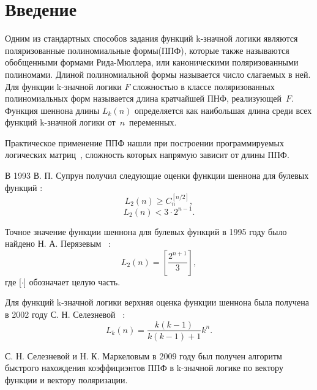 \documentclass[a4paper, 14pt]{extarticle}
\begin{document}


\setcounter{secnumdepth}{-1}

\section{Введение}
Одним из стандартных способов задания функций k\nobreakdash-значной логики являются поляризованные полиномиальные формы(ППФ),
которые также называются обобщенными формами Рида-Мюллера, или каноническими поляризованными полиномами.
Длиной полиномиальной формы называется число слагаемых в ней. Для функции k\nobreakdash-значной логики $F$ сложностью в классе
поляризованных полиномиальных форм называется длина кратчайшей ПНФ, реализующей~$F$.
Функция шеннона длины $L_k(n)$ определяется как наибольшая длина среди всех функций k\nobreakdash-значной логики от~$n$~переменных.

Практическое применение ППФ нашли при построении программируемых логических матриц~\cite{ue04}, сложность которых
напрямую зависит от длины ППФ.

В 1993  В. П. Супрун \cite{sv93} получил следующие оценки функции шеннона для булевых функций :
$$
L_2(n) \geqslant C_n^{[n/2]},
$$
$$
L_2(n) < 3 \cdot 2^{n-1}.
$$

Точное значение функции шеннона для булевых функций в 1995 году было
найдено Н. А. Перязевым~\cite{pn95} :
$$
L_2(n) = \left[\frac{2^{n+1}}{3}\right],
$$
где [$\cdot$] обозначает целую часть.

Для функций k\nobreakdash-значной логики верхняя оценка функции шеннона была получена в 2002 году С. Н. Селезневой~\cite{ss02} :
$$
L_k(n) = \frac{k(k-1)}{k(k-1)+1}k^n.
$$

С. Н. Селезневой и Н. К. Маркеловым в 2009 году \cite{sm09} был получен алгоритм быстрого нахождения коэффициэнтов
ППФ в k\nobreakdash-значной логике по вектору функции и вектору поляризации.

\makeatletter
\renewcommand*{\@biblabel}[1]{\hfill#1.}
\makeatother

\end{document}
